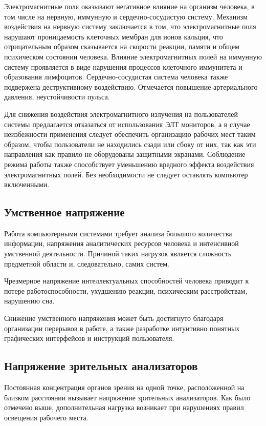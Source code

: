 \documentclass[14pt,oneside,final]{extreport}
\begin{document}
	Электромагнитные поля оказывают негативное влияние на организм  человека, в том числе на нервную, иммунную и сердечно-сосудистую систему. Механизм воздействия на нервную систему заключается в том, что электромагнитные поля нарушают проницаемость клеточных мембран для ионов кальция, что отрицательным образом сказывается на скорости реакции, памяти и общем психическом состоянии человека. Влияние электромагнитных полей на иммунную систему проявляется в виде нарушения процессов клеточного иммунитета и образования лимфоцитов. Сердечно-сосудистая система человека также подвержена деструктивному воздействию. Отмечается повышение артериального давления, неустойчивости пульса.   
	
	Для снижения воздействия электромагнитного излучения на пользователей системы предлагается отказаться от использования ЭЛТ мониторов, а в случае неизбежности применения следует обеспечить организацию рабочих мест таким образом, чтобы пользователи не находились сзади или сбоку от них, так как эти направления как правило не оборудованы защитными экранами. Соблюдение режима работы также способствует уменьшению вредного эффекта воздействия электромагнитных полей. Без необходимости не следует оставлять компьютер включенными.   
	\subsection{Умственное напряжение}
	Работа компьютерными системами требует анализа большого количества информации, напряжения аналитических ресурсов человека и интенсивной умственной деятельности. Причиной таких нагрузок является сложность предметной области и, следовательно, самих систем.   
	
	Чрезмерное напряжение интеллектуальных способностей человека приводит к потере работоспособности, ухудшению реакции, психическим расстройствам, нарушению сна. 
	
	Снижение умственного напряжения может быть достигнуто благодаря организации перерывов в работе, а также разработке интуитивно понятных графических интерфейсов и инструкций пользователя.  
	\subsection{Напряжение зрительных анализаторов}
	Постоянная концентрация органов зрения на одной точке, расположенной на близком расстоянии вызывает напряжение зрительных анализаторов. Как было отмечено выше, дополнительная нагрузка возникает при нарушениях правил освещения рабочего места. 
	
\end{document}

